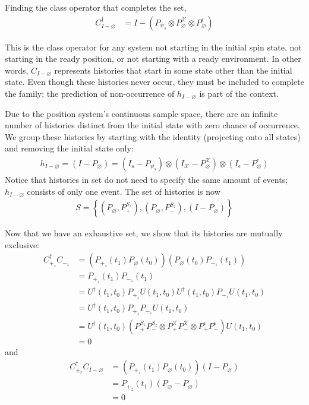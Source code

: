 Finding the class operator that completes the set,
\begin{align}
  C^\dagger_{I-\varnothing} &= I - \left(P_{\psi_s} \otimes P^\mathcal{X}_\varnothing \otimes P^\epsilon_\varnothing \right)
\end{align}

This is the class operator for any system not starting in the initial spin state, not starting in the ready position, or not starting with a ready environment. In other words, $C_{I-\varnothing}$ represents histories that start in some state other than the initial state. Even though these histories never occur, they must be included to complete the family; the prediction of non-occurrence of $h_{I - \varnothing}$ is part of the context.

Due to the position system's continuous sample space, there are an infinite number of histories distinct from the initial state with zero chance of occurrence. We group these histories by starting with the identity (projecting onto all states) and removing the initial state only:
\begin{align}
  h_{I-\varnothing} = \left(I - P_\varnothing \right) = \left(I_s - P_{\psi_s}\right) \otimes \left(I_\mathcal{X} - P_{\varnothing}^\mathcal{X} \right) \otimes \left(I_\epsilon - P^\epsilon_\varnothing \right)
\end{align}
Notice that histories in set do not need to specify the same amount of events; $h_{I-\varnothing}$ consists of only one event. The set of histories is now
\begin{align}
  S = \left\{\left( P_\varnothing, P^{S_z}_+ \right), \left(P_\varnothing, P^{S_z}_- \right), \left(I - P_\varnothing \right) \right\}
\end{align}

Now that we have an exhaustive set, we show that its histories are mutually exclusive:
\begin{align}
  C_{+_z}^\dagger C_{-_z} &= \left( P_{+_z}(t_1)  P_\varnothing(t_0) \right) \left(P_\varnothing(t_0) P_{-_z}(t_1) \right) \\ \nonumber
  &= P_{+_z}(t_1) P_{-_z}(t_1) \\ \nonumber
  &= U^\dagger(t_1, t_0) P_{+_z} U(t_1, t_0) U^\dagger(t_1, t_0) P_{-_z} U(t_1, t_0)  \\ \nonumber
  &= U^\dagger(t_1, t_0) P_{+_z}P_{-_z} U(t_1, t_0) \\ \nonumber
  &= U^\dagger(t_1, t_0) \left( P^{S_z}_+ P^{S_z}_-  \otimes P^\mathcal{X}_+ P^\mathcal{X}_- \otimes P^\epsilon_+ P^\epsilon_- \right) U(t_1, t_0) \\ \nonumber
  &= 0
\end{align}
and
\begin{align}
  C_{\pm_z}^\dagger C_{I-\varnothing} &= \left( P_{+_z}(t_1)  P_\varnothing(t_0) \right) \left(I-P_\varnothing\right) \\ \nonumber
  &= P_{+_z}(t_1)  \left(P_\varnothing - P_\varnothing \right)\\ \nonumber
  &= 0
\end{align}

